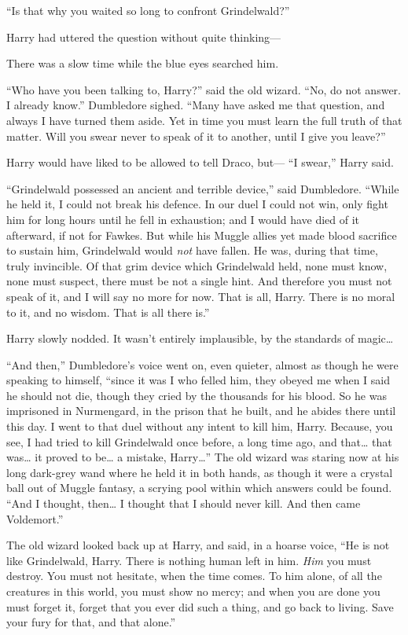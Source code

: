 ``Is that why you waited so long to confront Grindelwald?''

Harry had uttered the question without quite thinking---

There was a slow time while the blue eyes searched him.

``Who have you been talking to, Harry?'' said the old wizard. ``No, do
not answer. I already know.'' Dumbledore sighed. ``Many have asked me
that question, and always I have turned them aside. Yet in time you must
learn the full truth of that matter. Will you swear never to speak of it
to another, until I give you leave?''

Harry would have liked to be allowed to tell Draco, but--- ``I swear,''
Harry said.

``Grindelwald possessed an ancient and terrible device,'' said
Dumbledore. ``While he held it, I could not break his defence. In our
duel I could not win, only fight him for long hours until he fell in
exhaustion; and I would have died of it afterward, if not for Fawkes.
But while his Muggle allies yet made blood sacrifice to sustain him,
Grindelwald would \emph{not} have fallen. He was, during that time,
truly invincible. Of that grim device which Grindelwald held, none must
know, none must suspect, there must be not a single hint. And therefore
you must not speak of it, and I will say no more for now. That is all,
Harry. There is no moral to it, and no wisdom. That is all there is.''

Harry slowly nodded. It wasn't entirely implausible, by the standards of
magic\ldots{}

``And then,'' Dumbledore's voice went on, even quieter, almost as though
he were speaking to himself, ``since it was I who felled him, they
obeyed me when I said he should not die, though they cried by the
thousands for his blood. So he was imprisoned in Nurmengard, in the
prison that he built, and he abides there until this day. I went to that
duel without any intent to kill him, Harry. Because, you see, I had
tried to kill Grindelwald once before, a long time ago, and that\ldots{}
that was\ldots{} it proved to be\ldots{} a mistake, Harry\ldots{}'' The
old wizard was staring now at his long dark-grey wand where he held it
in both hands, as though it were a crystal ball out of Muggle fantasy, a
scrying pool within which answers could be found. ``And I thought,
then\ldots{} I thought that I should never kill. And then came
Voldemort.''

The old wizard looked back up at Harry, and said, in a hoarse voice,
``He is not like Grindelwald, Harry. There is nothing human left in him.
\emph{Him} you must destroy. You must not hesitate, when the time comes.
To him alone, of all the creatures in this world, you must show no
mercy; and when you are done you must forget it, forget that you ever
did such a thing, and go back to living. Save your fury for that, and
that alone.''

